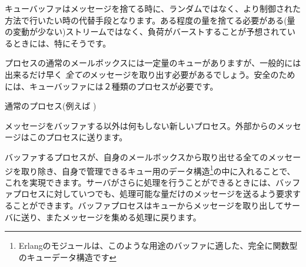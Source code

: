 キューバッファはメッセージを捨てる時に、ランダムではなく、より制御された方法で行いたい時の代替手段となります。ある程度の量を捨てる必要がある(量の変動が少ない)ストリームではなく、負荷がバーストすることが予想されているときには、特にそうです。

プロセスの通常のメールボックスには一定量のキューがありますが、一般的には出来るだけ早く \emph{全ての}メッセージを取り出す必要があるでしょう。安全のためには、キューバッファには２種類のプロセスが必要です。


\begin{itemize*}
	\item 通常のプロセス(例えば )
	\item メッセージをバッファする以外は何もしない新しいプロセス。外部からのメッセージはこのプロセスに送ります。
\end{itemize*}

バッファするプロセスが、自身のメールボックスから取り出せる全てのメッセージを取り除き、自身で管理できるキュー用のデータ構造\footnote{Erlangのモジュールは、このような用途のバッファに適した、完全に関数型のキューデータ構造です}の中に入れることで、これを実現できます。サーバがさらに処理を行うことができるときには、バッファプロセスに対していつでも、処理可能な量だけのメッセージを送るよう要求することができます。バッファプロセスはキューからメッセージを取り出してサーバに送り、またメッセージを集める処理に戻ります。

